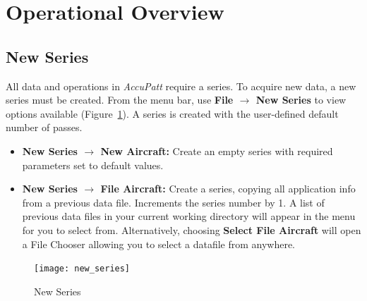 \documentclass[10pt,letterpaper,titlepage]{article}
\begin{document}
    \section{Operational Overview}
    
    \subsection{New Series}
    All data and operations in \textit{AccuPatt} require a series. To acquire new data, a new series must be created. From the menu bar, use \textbf{File $\rightarrow$ New Series} to view options available (Figure~\ref{fig:new_series}). A series is created with the user-defined default number of passes.
    \begin{itemize}
        \item \textbf{New Series $\rightarrow$ New Aircraft:} Create an empty series with required parameters set to default values.
        \item \textbf{New Series $\rightarrow$ File Aircraft:} Create a series, copying all application info from a previous data file. Increments the series number by 1. A list of previous data files in your current working directory will appear in the menu for you to select from. Alternatively, choosing \textbf{Select File Aircraft} will open a File Chooser allowing you to select a datafile from anywhere.
    \end{itemize}
    \begin{figure}[hb]
        \centering
        \texttt{[image: new\_series]}
        \caption{New Series}
        \label{fig:new_series}
    \end{figure}
    
\end{document}
